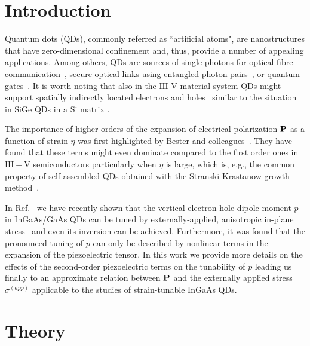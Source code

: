 \documentclass[aps,prl,amsmath,amssymb,twocolumn,showpacs,showkeys,superscriptaddress]{revtex4-1}
\begin{document}
%

\maketitle

\section{Introduction}

Quantum dots (QDs), commonly referred as ``artificial atoms", are nanostructures that have zero-dimensional confinement and, thus, provide a number of appealing applications. Among others, QDs are sources of single photons for optical fibre communication~\cite{Huffaker1998}, secure optical links using entangled photon pairs~\cite{Trotta:16}, or quantum gates~\cite{Krapek2010,Klenovsky2016}. It is worth noting that also in the $\text{III-V}$ material system QDs might support spatially indirectly located electrons and holes~\cite{Klenovsky2015,Klenovsky2017} similar to the situation in SiGe QDs in a Si matrix \cite{2009NJoP_Brehm,KlenovskyPRB2012}. 

The importance of higher orders of the expansion of electrical polarization ${\bf P}$ as a function of strain $\eta$ was first highlighted by Bester and colleagues~\citep{Bester:06, Bester:06_2}. They have found that these terms might even dominate compared to the first order ones in $\mathrm{III-V}$ semiconductors particularly when $\eta$ is large, which is, e.g., the common property of self-assembled QDs obtained with the Stranski-Krastanow growth method~\cite{Grundmann:95}.

In Ref.~\cite{Aberl:17} we have recently shown that the vertical electron-hole dipole moment $p$ in InGaAs/GaAs QDs can be tuned by externally-applied, anisotropic in-plane stress~\cite{Trotta:12,Trotta:13} and even its inversion can be achieved. Furthermore, it was found that the pronounced tuning of $p$ can only be described by nonlinear terms in the expansion of the piezoelectric tensor. In this work we provide more details on the effects of the second-order piezoelectric terms on the tunability of $p$ leading us finally to an approximate relation between
${\bf P}$
and the externally applied stress $\sigma^{(app)}$ applicable to the studies of strain-tunable InGaAs QDs. 

\section{Theory}
\end{document}
